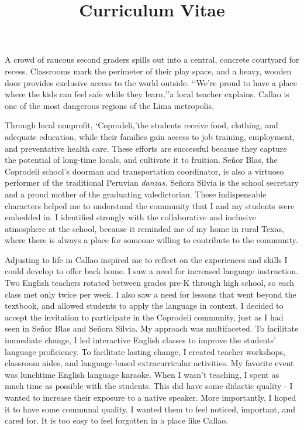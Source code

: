 \documentclass[12pt,a4paper,roman]{moderncv} %
\title{Curriculum Vitae}
\begin{document}


\clearpage


A crowd of raucous second graders spills out into a central, concrete courtyard for recess. Classrooms mark the perimeter of their play space, and a heavy, wooden door provides exclusive access to the world outside. \lq\lq We're proud to have a place where the kids can feel safe while they learn,\rq\rq\space a local teacher explains. Callao is one of the most dangerous regions of the Lima metropolis.

\medskip
 
Through local nonprofit, \lq Coprodeli,\rq\space the students receive food, clothing, and adequate education, while their families gain access to job training, employment, and preventative health care. These efforts are successful because they capture the potential of long-time locals, and cultivate it to fruition. Se\~nor Blas, the Coprodeli school's doorman and transportation coordinator, is also a virtuoso performer of the traditional Peruvian \textit{danzas.} Se\~nora Silvia is the school secretary and a proud mother of the graduating valedictorian. These indispensable characters helped me to understand the community that I and my students were embedded in. I identified strongly with the collaborative and inclusive atmosphere at the school, because it reminded me of my home in rural Texas, where there is always a place for someone willing to contribute to the community.

\medskip

Adjusting to life in Callao inspired me to reflect on the experiences and skills I could develop to offer back home. I saw a need for increased language instruction. Two English teachers rotated between grades pre-K through high school, so each class met only twice per week. I also saw a need for lessons that went beyond the textbook, and allowed students to apply the language in context. I decided to accept the invitation to participate in the Coprodeli community, just as I had seen in Se\~nor Blas and Se\~nora Silvia.  My approach was multifaceted. To facilitate immediate change, I led interactive English classes to improve the students' language proficiency. To facilitate lasting change, I created teacher workshops, classroom aides, and language-based extracurricular activities. My favorite event was lunchtime English language karaoke. When I wasn't teaching, I spent as much time as possible with the students. This did have some didactic quality - I wanted to increase their exposure to a native speaker. More importantly, I hoped it to have some communal quality. I wanted them to feel noticed, important, and cared for. It is too easy to feel forgotten in a place like Callao.
\end{document}
